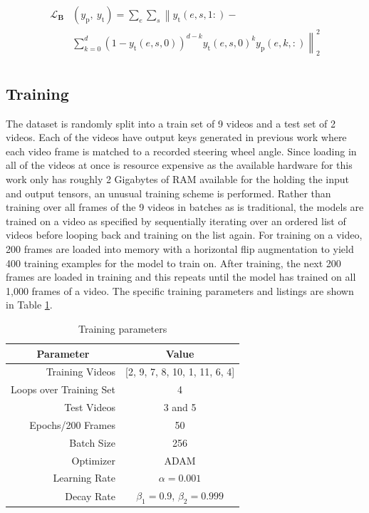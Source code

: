 \documentclass[conference]{IEEEtran}
\begin{document}
\begin{equation}
\label{eq:bl}
\begin{split}
\mathcal{L}_\mathbf{B}&(y_{\text{p}},\ y_{\text{t}}) = \sum_{e} \sum_{s} \left\| y_{\text{t}}(e,s,1:) -  \right. \\
&\left. \sum_{k=0}^d (1 - y_{\text{t}}(e,s,0))^{d-k} y_{\text{t}}(e,s,0)^k y_{\text{p}}(e,k,:) \right\|_2^2\\
\end{split}
\end{equation}

\subsection{Training}

The dataset is randomly split into a train set of 9 videos and a test set of 2 videos. Each of the videos have output keys generated in previous work where each video frame is matched to a recorded steering wheel angle. Since loading in all of the videos at once is resource expensive as the available hardware for this work only has roughly 2 Gigabytes of RAM available for the holding the input and output tensors, an unusual training scheme is performed. Rather than training over all frames of the 9 videos in batches as is traditional, the models are trained on a video as specified by sequentially iterating over an ordered list of videos before looping back and training on the list again. For training on a video, 200 frames are loaded into memory with a horizontal flip augmentation to yield 400 training examples for the model to train on. After training, the next 200 frames are loaded in training and this repeats until the model has trained on all 1,000 frames of a video. The specific training parameters and listings are shown in Table \ref{tab:training-parameters}.

\begin{table}[btp]
	\centering
	\caption{Training parameters}
	\begin{tabular}{|r|c|}
	\multicolumn{1}{c}{\textbf{Parameter}} & \multicolumn{1}{c}{\textbf{Value}} \\\hline
	Training Videos & [2, 9, 7, 8, 10, 1, 11, 6, 4] \\
	Loops over Training Set & 4\\
	Test Videos & 3 and 5 \\
	Epochs/200 Frames & 50 \\
	Batch Size & 256 \\
	Optimizer & ADAM \\
	Learning Rate & $\alpha=0.001$ \\
	Decay Rate & $\beta_1 = 0.9$, $\beta_2=0.999$ \\ \hline
	\end{tabular}
	\label{tab:training-parameters}
\end{table}
\end{document}
